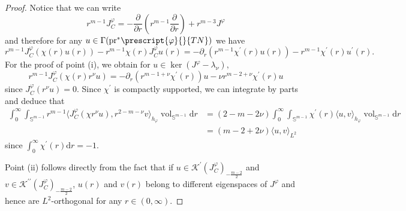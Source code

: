 \documentclass{article}
\numberwithin{equation}{section}        %
\theoremstyle{bfnote}
\theoremstyle{definition}
\theoremstyle{bfremark}
\newcommand{\Sp}{\mathbb{S}}                %
\newcommand{\pr}{\mathrm{pr}}               %
\newcommand{\diff}{\mathrm{d}}                      %
\DeclareMathOperator{\vol}{vol}                 %
\begin{document}
\begin{proof}
    Notice that we can write
    \begin{equation*}
        r^{m-1}J^\varphi_C = -\frac{\partial}{\partial r} \left( r^{m-1} \frac{\partial}{\partial r} \right) + r^{m-3} J^\varphi
    \end{equation*}
    and therefore for any $u \in \Gamma(\pr^*\prescript{\varphi}{}{TN})$ we have
    \begin{equation*}
        r^{m-1}J^\varphi_C(\chi(r)u(r)) - r^{m-1}\chi(r) J^\varphi_C u(r) = - \partial_r(r^{m-1} \chi^\prime(r) u(r)) - r^{m-1}\chi^\prime(r)u^\prime(r) .
    \end{equation*}
    For the proof of point (i), we obtain for $u \in \ker(J^\varphi-\lambda_\nu)$,
    \begin{equation*}
        r^{m-1}J^\varphi_C(\chi(r) r^\nu u) = - \partial_r( r^{m-1+\nu} \chi^\prime(r))u - \nu r^{m-2+\nu} \chi^\prime(r) u
    \end{equation*}
    since $J^\varphi_C (r^\nu u) = 0$. Since $\chi^\prime$ is compactly supported, we can integrate by parts and deduce that
    \begin{align*}
        \int_0^\infty \int_{\Sp^{m-1}} r^{m-1} \langle J^\varphi_C (\chi r^\nu u), r^{2-m-\nu} v \rangle_{h_\varphi} \vol_{\Sp^{m-1}} \diff  r & = (2-m-2\nu) \int_0^\infty \int_{\Sp^{m-1}} \chi^\prime(r)  \langle u, v \rangle_{h_\varphi} \vol_{\Sp^{m-1}} \diff  r \\
            & = (m-2 + 2\nu) \langle u, v \rangle_{L^2}
    \end{align*}
    since $\int_0^\infty \chi^\prime(r) \diff  r = -1$.

    Point (ii) follows directly from the fact that if $u \in \mathcal{K}^\prime(J^\varphi_C)_{-\tfrac{m-2}{2}}$ and $v \in \mathcal{K}^{\prime\prime}(J^\varphi_C)_{-\tfrac{m-2}{2}}$, $u(r)$ and $v(r)$ belong to different eigenspaces of $J^\varphi$ and hence are $L^2$-orthogonal for any $r \in (0,\infty)$.
    

\end{proof}
\end{document}
